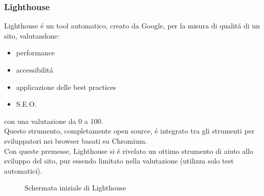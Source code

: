 \documentclass{article}
\begin{document}
\subsubsection*{Lighthouse}
Lighthouse é un tool automatico, creato da Google, per la misura di qualitá di un sito, valutandone:
\begin{itemize}
	\item performance
	\item accessibilitá
	\item applicazione delle best practices
	\item S.E.O.
\end{itemize}
con una valutazione da 0 a 100.\\
Questo strumento, completamente open source, é integrato tra gli strumenti per sviluppatori nei browser basati su Chromium.\\
Con queste premesse, Lighthouse si é rivelato un ottimo strumento di aiuto allo sviluppo del sito, pur essendo limitato nella valutazione (utilizza solo test automatici).

\begin{figure}[H]
	\centering
	\caption{Schermata iniziale di Lighthouse}
\end{figure}
\end{document}
